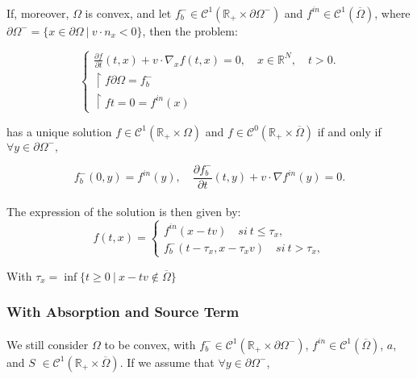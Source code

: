 \documentclass[onecolumn, 12pt, a4paper]{article}
\begin{document}
	\paragraph{}
	If, moreover, $\Omega$ is convex, and let $f_b^- \in \mathcal{C}^1(\mathbb{R}_+ \times \partial \Omega^-)$ and $f^{in} \in \mathcal{C}^1(\overline{\Omega})$, where $\partial \Omega^- = \{x\in\partial \Omega~ | ~ v\cdot n_x<0\}$, then the problem:
	
	
	\[
	\begin{cases}
		\frac{\partial f}{\partial t}(t,x)+v \cdot \nabla_x f(t,x)=0, \quad x \in \mathbb{R}^N, \quad t>0.\\
		\restriction{f}{\partial \Omega}= f_b^-\\
		\restriction{f}{t=0}= f^{in}(x)
	\end{cases}
	\]
	
	has a unique solution $f \in \mathcal{C}^1(\mathbb{R}_+ \times \Omega)$ and $f \in \mathcal{C}^0(\mathbb{R}_+ \times \overline{\Omega})$ if and only if $\forall y \in \partial \Omega^-,$
	
	\[ f_b^-(0,y) = f^{in}(y), \quad \frac{\partial f_b^-}{\partial t}(t,y)+v \cdot \nabla f^{in}(y)=0. \]
	
	\paragraph{}
	
	The expression of the solution is then given by: 
	\[
	\boxed{
		f(t,x)= 
		\begin{cases}
			f^{in}(x-tv) \quad si~ t \leq \tau_x ,\\
			f_b^-(t-\tau_x,x-\tau_xv) \quad si~ t > \tau_x ,
		\end{cases}
	}
	\]
	
	With $\tau_x= \inf \{t \geq 0~ | ~ x-tv \notin \overline{\Omega}\}$
	
	\subsubsection{With Absorption and Source Term}
	
	\paragraph{}
	We still consider $\Omega$ to be convex, with $f_b^- \in \mathcal{C}^1(\mathbb{R}_+ \times \partial \Omega^-)$, $f^{in} \in \mathcal{C}^1(\overline{\Omega})$, $a$, and $S$ $\in \mathcal{C}^1(\mathbb{R}_+ \times \overline{\Omega})$. If we assume that $\forall y \in \partial \Omega^-$,
	
\end{document}
